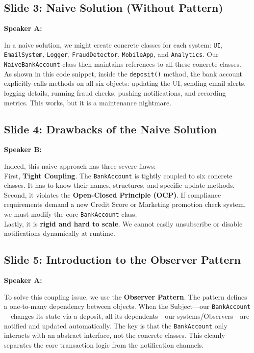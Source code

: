 \documentclass[11pt,a4paper]{article}
\newenvironment{dialogue}[1]{
    \begin{mdframed}[linecolor=gray!40,backgroundcolor=gray!5,roundcorner=5pt,innerleftmargin=10pt,innerrightmargin=10pt,innertopmargin=8pt,innerbottommargin=8pt]
    \textbf{#1:}
}{
    \end{mdframed}
}
\begin{document}
\subsection*{Slide 3: Naive Solution (Without Pattern)}
\begin{dialogue}{Speaker A}
    In a naive solution, we might create concrete classes for each system: \texttt{UI}, \texttt{EmailSystem}, \texttt{Logger}, \texttt{FraudDetector}, \texttt{MobileApp}, and \texttt{Analytics}. Our \texttt{NaiveBankAccount} class then maintains references to all these concrete classes. 
    As shown in this code snippet, inside the \texttt{deposit()} method, the bank account explicitly calls methods on all six objects: updating the UI, sending email alerts, logging details, running fraud checks, pushing notifications, and recording metrics. This works, but it is a maintenance nightmare.
\end{dialogue}

\newpage
\subsection*{Slide 4: Drawbacks of the Naive Solution}
\begin{dialogue}{Speaker B}
    Indeed, this naive approach has three severe flaws: \\
    First, \textbf{Tight Coupling}. The \texttt{BankAccount} is tightly coupled to six concrete classes. It has to know their names, structures, and specific update methods. \\
    Second, it violates the \textbf{Open-Closed Principle (OCP)}. If compliance requirements demand a new Credit Score or Marketing promotion check system, we must modify the core \texttt{BankAccount} class. \\
    Lastly, it is \textbf{rigid and hard to scale}. We cannot easily unsubscribe or disable notifications dynamically at runtime.
\end{dialogue}

\subsection*{Slide 5: Introduction to the Observer Pattern}
\begin{dialogue}{Speaker A}
    To solve this coupling issue, we use the \textbf{Observer Pattern}. The pattern defines a one-to-many dependency between objects. When the Subject---our \texttt{BankAccount}---changes its state via a deposit, all its dependents---our systems/Observers---are notified and updated automatically. 
    The key is that the \texttt{BankAccount} only interacts with an abstract interface, not the concrete classes. This cleanly separates the core transaction logic from the notification channels.
\end{dialogue}
\end{document}
